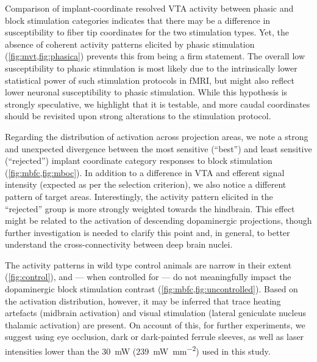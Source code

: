 Comparison of implant-coordinate resolved VTA activity between phasic and block stimulation categories indicates that there may be a difference in susceptibility to fiber tip coordinates for the two stimulation types.
Yet, the absence of coherent activity patterns elicited by phasic stimulation (\cref{fig:mvt,fig:phasica}) prevents this from being a firm statement.
The overall low susceptibility to phasic stimulation is most likely due to the intrinsically lower statistical power of such stimulation protocols in fMRI, but might also reflect lower neuronal susceptibility to phasic stimulation.
While this hypothesis is strongly speculative, we highlight that it is testable, and more caudal coordinates should be revisited upon strong alterations to the stimulation protocol.

Regarding the distribution of activation across projection areas, we note a strong and unexpected divergence between the most sensitive (“best”) and least sensitive (“rejected”) implant coordinate category responses to block stimulation (\cref{fig:mbfc,fig:mboc}).
In addition to a difference in VTA and efferent signal intensity (expected as per the selection criterion), we also notice a different pattern of target areas.
Interestingly, the activity pattern elicited in the “rejected” group is more strongly weighted towards the hindbrain.
This effect might be related to the activation of descending dopaminergic projections, though further investigation is needed to clarify this point and, in general, to better understand the cross-connectivity between deep brain nuclei.

The activity patterns in wild type control animals are narrow in their extent (\cref{fig:control}), and --- when controlled for --- do not meaningfully impact the dopaminergic block stimulation contrast (\cref{fig:mbfc,fig:uncontrolled}).
Based on the activation distribution, however, it may be inferred that trace heating artefacts (midbrain activation) and visual stimulation (lateral geniculate nucleus thalamic activation) are present.
On account of this, for further experiments, we suggest using eye occlusion, dark or dark-painted ferrule sleeves, as well as laser intensities lower than the \SI{30}{\milli\watt} (\SI{239}{\milli\watt\per\milli\meter\squared}) used in this study.

